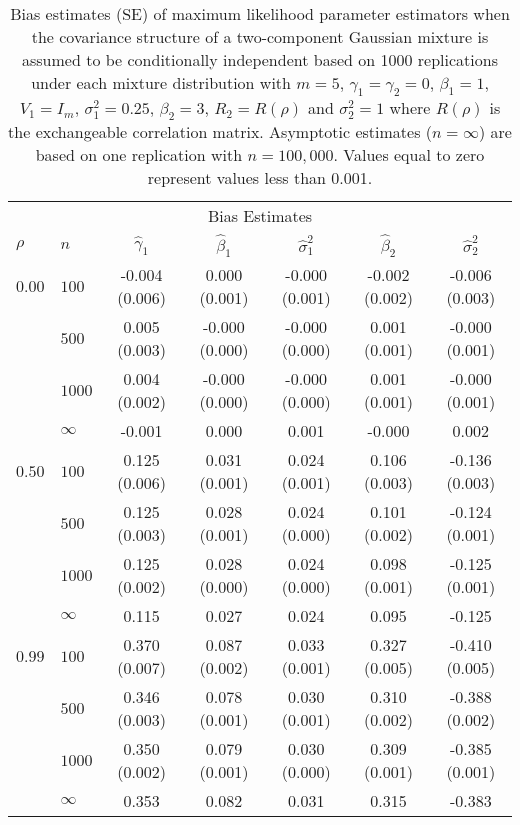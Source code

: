 \begin{table}[ht]
\begin{center}
\begin{tabular}{llccccc}
   \hline \multicolumn{7}{c}{Bias Estimates}\\ $\rho$ & $n$ & $\widehat{\gamma}_1$ & $\widehat{\beta}_1$ & $\widehat{\sigma}^2_1$ & $\widehat{\beta}_2$ & $\widehat{\sigma}^2_2$ \\ 
   \hline$0.00$ & $100$ & -0.004 (0.006) & 0.000 (0.001) & -0.000 (0.001) & -0.002 (0.002) & -0.006 (0.003) \\ 
    & $500$ & 0.005 (0.003) & -0.000 (0.000) & -0.000 (0.000) & 0.001 (0.001) & -0.000 (0.001) \\ 
    & $1000$ & 0.004 (0.002) & -0.000 (0.000) & -0.000 (0.000) & 0.001 (0.001) & -0.000 (0.001) \\ 
    & $\infty$ & -0.001 & 0.000 & 0.001 & -0.000 & 0.002 \\ 
  $0.50$ & $100$ & 0.125 (0.006) & 0.031 (0.001) & 0.024 (0.001) & 0.106 (0.003) & -0.136 (0.003) \\ 
    & $500$ & 0.125 (0.003) & 0.028 (0.001) & 0.024 (0.000) & 0.101 (0.002) & -0.124 (0.001) \\ 
    & $1000$ & 0.125 (0.002) & 0.028 (0.000) & 0.024 (0.000) & 0.098 (0.001) & -0.125 (0.001) \\ 
    & $\infty$ & 0.115 & 0.027 & 0.024 & 0.095 & -0.125 \\ 
  $0.99$ & $100$ & 0.370 (0.007) & 0.087 (0.002) & 0.033 (0.001) & 0.327 (0.005) & -0.410 (0.005) \\ 
    & $500$ & 0.346 (0.003) & 0.078 (0.001) & 0.030 (0.001) & 0.310 (0.002) & -0.388 (0.002) \\ 
    & $1000$ & 0.350 (0.002) & 0.079 (0.001) & 0.030 (0.000) & 0.309 (0.001) & -0.385 (0.001) \\ 
    & $\infty$ & 0.353 & 0.082 & 0.031 & 0.315 & -0.383 \\ 
   \hline\end{tabular}
\caption{Bias estimates (SE) of maximum likelihood parameter estimators when the covariance structure of a two-component Gaussian mixture is assumed to be conditionally independent based on 1000 replications under each mixture distribution with $m=5$, $\gamma_1=\gamma_2=0$, $\beta_{1}=1$, $V_1=I_{m}$, $\sigma_1^{2}=0.25$, $\beta_2=3$, $R_2=R(\rho)$ and $\sigma_2^{2}=1$ where $R(\rho)$ is the exchangeable correlation matrix. Asymptotic estimates ($n=\infty$) are based on one replication with $n=100,000$. Values equal to zero represent values less than 0.001.}
\label{tab:dep1}
\end{center}
\end{table}\clearpage
